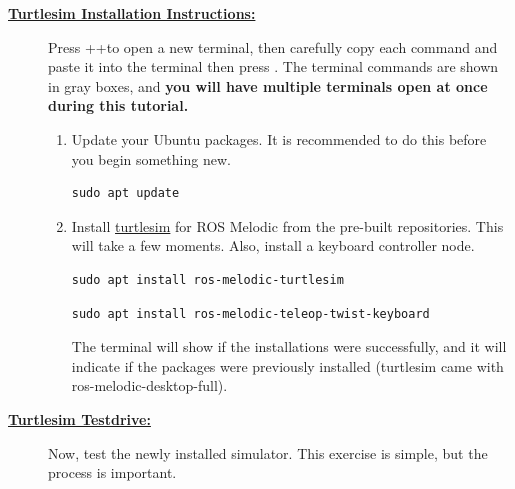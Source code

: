 \documentclass[12pt]{article}
\newcommand{\T}{\raisebox{-0.1em}{T}}
\newcommand{\TKey}{\keystroke{\T}}
\newcommand{\CTRL}{\raisebox{-0.1em}{Ctrl}}
\newcommand{\CTRLKey}{\keystroke{\CTRL}}
\newcommand{\ALT}{\raisebox{-0.1em}{Alt}}
\newcommand{\ALTKey}{\keystroke{\ALT}}
\newcommand{\ENTER}{\raisebox{-0.1em}{Enter}}
\newcommand{\ENTERKey}{\keystroke{\ENTER}}
\begin{document}
\begin{description}
\begin{itemize}
\end{itemize}

\item[\textbf{\underline{Turtlesim Installation Instructions:}}] \hfill \vspace{0mm}

Press \CTRLKey+\ALTKey+\TKey to open a new terminal, then carefully copy each command and paste it into the terminal then press \ENTERKey. The terminal commands are shown in gray boxes, and {\bf you will have multiple terminals open at once during this tutorial.} 


\begin{enumerate}    
 
	\item Update your Ubuntu packages. It is recommended to do this before you begin something new. 

	\begin{verbatim}
sudo apt update
	\end{verbatim} 
 
\item Install \href{http://wiki.ros.org/turtlesim}{turtlesim} for ROS Melodic from the pre-built repositories. This will take a few moments. Also, install a keyboard controller node.
			
\begin{verbatim}
sudo apt install ros-melodic-turtlesim
\end{verbatim}

\begin{verbatim}
sudo apt install ros-melodic-teleop-twist-keyboard
\end{verbatim}
	
The terminal will show if the installations were successfully, and it will indicate if the packages were previously installed (turtlesim came with ros-melodic-desktop-full).
	
\end{enumerate}	

\newpage
\item[\textbf{\underline{Turtlesim Testdrive:}}] \hfill \vspace{0mm}

Now, test the newly installed simulator. This exercise is simple, but the process is important. 

%
\begin{enumerate}


\end{enumerate}
\end{description}
\end{document}
